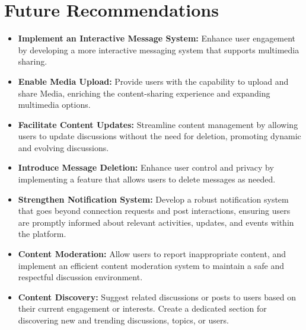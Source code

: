 \newpage
\section{Future Recommendations}
\begin{itemize}
    \item \textbf{Implement an Interactive Message System:} Enhance user engagement by developing a more interactive messaging system that supports multimedia sharing.
    \item \textbf{Enable Media Upload:} Provide users with the capability to upload and share Media, enriching the content-sharing experience and expanding multimedia options.
    \item \textbf{Facilitate Content Updates:} Streamline content management by allowing users to update discussions without the need for deletion, promoting dynamic and evolving discussions.
    \item \textbf{Introduce Message Deletion:}  Enhance user control and privacy by implementing a feature that allows users to delete messages as needed.
    \item \textbf{Strengthen Notification System:} Develop a robust notification system that goes beyond connection requests and post interactions, ensuring users are promptly informed about relevant activities, updates, and events within the platform.
    \item \textbf{Content Moderation:}
     Allow users to report inappropriate content, and implement an efficient content moderation system to maintain a safe and respectful discussion environment.
    

    \item \textbf{Content Discovery:} Suggest related discussions or posts to users based on their current engagement or interests.
    Create a dedicated section for discovering new and trending discussions, topics, or users.
\end{itemize}

